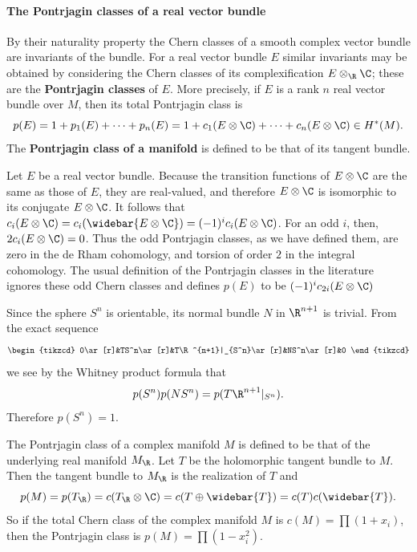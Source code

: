 \paragraph{The Pontrjagin classes of a real vector bundle}
By their naturality property the Chern classes of a smooth complex vector bundle are invariants of the bundle. For a real vector bundle $E$ similar invariants may be 
obtained by considering the Chern classes of its complexification $E\otimes_\R\C$; these are the \textbf{Pontrjagin classes} of $E$. More precisely, if $E$ is a rank $n$ 
real vector bundle over $M$, then its total Pontrjagin class is
\[p(E)=1+p_1(E)+\cdots+p_n(E)=1+c_1(E\otimes\C)+\cdots+c_n(E\otimes\C)\in H^*(M).\]
The \textbf{Pontrjagin class of a manifold} is defined to be that of its tangent bundle.
\begin{remark}
Let $E$ be a real vector bundle. Because the transition functions of $E\otimes\C$ are the same as those of $E$, they are real-valued, and therefore $E\otimes\C$ is 
isomorphic to its conjugate $E\otimes\C$. It follows that $c_i(E\otimes\C)=c_i(\widebar{E\otimes\C})=(-1)^ic_i(E\otimes\C)$. For an odd $i$, then, $2c_i(E\otimes\C)=0$. 
Thus the odd Pontrjagin classes, as we have defined them, are zero in the de Rham cohomology, and torsion of order $2$ in the integral cohomology. The usual definition 
of the Pontrjagin classes in the literature ignores these odd Chern classes and defines $p(E)$ to be $(-1)^ic_{2i}(E\otimes\C)$
\end{remark}
\begin{example}
Since the sphere $S^n$ is orientable, its normal bundle $N$ in $\R^{n+1}$ is trivial. From the exact sequence
\[\begin{tikzcd}
0\ar[r]&TS^n\ar[r]&T\R^{n+1}|_{S^n}\ar[r]&NS^n\ar[r]&0
\end{tikzcd}\]
we see by the Whitney product formula that
\[p(S^n)p(NS^n)=p(T\R^{n+1}|_{S^n}).\]
Therefore $p(S^n)=1$.
\end{example}
\begin{example}\label{Pontrjagin class complex mani}
The Pontrjagin class of a complex manifold $M$ is defined to be that of the underlying real manifold $M_{\R}$. Let $T$ be the holomorphic tangent bundle to $M$. Then 
the tangent bundle to $M_\R$ is the realization of $T$ and
\[p(M)=p(T_{\R})=c(T_{\R}\otimes\C)=c(T\oplus\widebar{T})=c(T)c(\widebar{T}).\]
So if the total Chern class of the complex manifold $M$ is $c(M)=\prod(1+x_i)$, then the Pontrjagin class is $p(M)=\prod(1-x_i^2)$.
\end{example}
